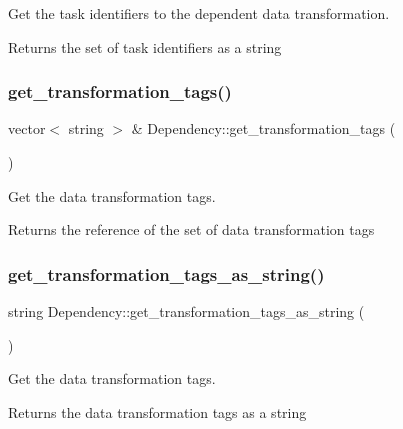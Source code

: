Get the task identifiers to the dependent data transformation. \begin{DoxyReturn}{Returns}
the set of task identifiers as a string 
\end{DoxyReturn}
\mbox{\label{classDependency_a89bbac105889b8fcf84a32f731a3a0b8}} 
\subsubsection{\texorpdfstring{get\+\_\+transformation\+\_\+tags()}{get\_transformation\_tags()}}
{\footnotesize\ttfamily vector$<$ string $>$ \& Dependency\+::get\+\_\+transformation\+\_\+tags (\begin{DoxyParamCaption}{ }\end{DoxyParamCaption})}

Get the data transformation tags. \begin{DoxyReturn}{Returns}
the reference of the set of data transformation tags 
\end{DoxyReturn}
\mbox{\label{classDependency_a158cbadc3e5d8a2a062a0f70c130821f}} 
\subsubsection{\texorpdfstring{get\+\_\+transformation\+\_\+tags\+\_\+as\+\_\+string()}{get\_transformation\_tags\_as\_string()}}
{\footnotesize\ttfamily string Dependency\+::get\+\_\+transformation\+\_\+tags\+\_\+as\+\_\+string (\begin{DoxyParamCaption}{ }\end{DoxyParamCaption})}

Get the data transformation tags. \begin{DoxyReturn}{Returns}
the data transformation tags as a string 
\end{DoxyReturn}
\mbox{\label{classDependency_ac942f51b05df8875957b99ce74b9baec}} 
